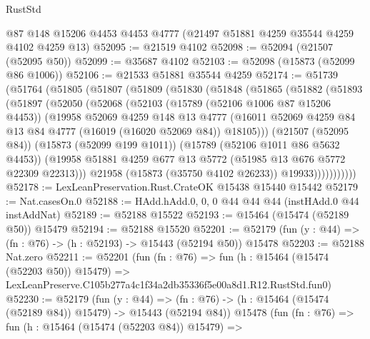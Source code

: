 \begin{lexlean}{RustStd}
\begin{coremodule}
    @87
    @148
    @15206
    @4453
    @4453
    @4777
    (@21497 @51881 @4259 @35544 @4259 @4102 @4259 @13)
@52095 := @21519 @4102
@52098 := @52094 (@21507 (@52095 @50))
@52099 := @35687 @4102
@52103 := @52098 (@15873 (@52099 @86 @1006))
@52106 := @21533 @51881 @35544 @4259
@52174 := @51739
    (@51764
      (@51805
        (@51807
          (@51809
            (@51830
              (@51848
                (@51865
                  (@51882
                    (@51893
                      (@51897
                        (@52050
                          (@52068
                            (@52103
                              (@15789 (@52106 @1006 @87 @15206 @4453))
                              (@19958
                                @52069
                                @4259
                                @148
                                @13
                                @4777
                                (@16011
                                  @52069
                                  @4259
                                  @84
                                  @13
                                  @84
                                  @4777
                                  (@16019 (@16020 @52069 @84))
                                  @18105)))
                            (@21507 (@52095 @84))
                            (@15873 (@52099 @199 @1011))
                            (@15789 (@52106 @1011 @86 @5632 @4453))
                            (@19958
                              @51881
                              @4259
                              @677
                              @13
                              @5772
                              (@51985 @13 @676 @5772 @22309 @22313)))
                          @21958
                          (@15873 (@35750 @4102 @26233))
                          @19933)))))))))))
@52178 := LexLeanPreservation.Rust.CrateOK @15438 @15440 @15442
@52179 := Nat.casesOn.{0}
@52188 := HAdd.hAdd.{0, 0, 0} @44 @44 @44 (instHAdd.{0} @44 instAddNat)
@52189 := @52188 @15522
@52193 := @15464 (@15474 (@52189 @50)) @15479
@52194 := @52188 @15520
@52201 := @52179 (fun (y : @44) => (fn : @76) -> (h : @52193) -> @15443 (@52194 @50)) @15478
@52203 := @52188 Nat.zero
@52211 := @52201
    (fun (fn : @76) =>
    fun (h : @15464 (@15474 (@52203 @50)) @15479) =>
    LexLeanPreserve.C105b277a4c1f34a2db35336f5e00a8d1.R12.RustStd.fun0)
@52230 := @52179
    (fun (y : @44) =>
    (fn : @76) -> (h : @15464 (@15474 (@52189 @84)) @15479) -> @15443 (@52194 @84))
    @15478
    (fun (fn : @76) =>
    fun (h : @15464 (@15474 (@52203 @84)) @15479) =>

\end{coremodule}
\end{lexlean}
